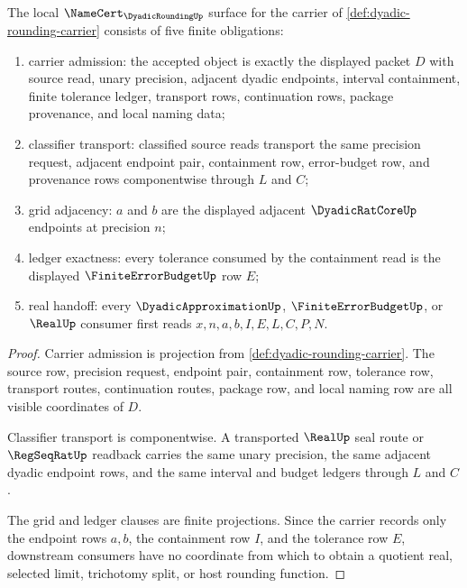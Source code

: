 \begin{theorem}
\label{thm:dyadic-rounding-namecert-obligations}
The local $\NameCert_{\DyadicRoundingUp}$ surface for the carrier of \autoref{def:dyadic-rounding-carrier} consists of five finite obligations:
\begin{enumerate}
\item carrier admission: the accepted object is exactly the displayed packet $D$ with source read, unary precision, adjacent dyadic endpoints, interval containment, finite tolerance ledger, transport rows, continuation rows, package provenance, and local naming data;
\item classifier transport: classified source reads transport the same precision request, adjacent endpoint pair, containment row, error-budget row, and provenance rows componentwise through $L$ and $C$;
\item grid adjacency: $a$ and $b$ are the displayed adjacent $\DyadicRatCoreUp$ endpoints at precision $n$;
\item ledger exactness: every tolerance consumed by the containment read is the displayed $\FiniteErrorBudgetUp$ row $E$;
\item real handoff: every $\DyadicApproximationUp$, $\FiniteErrorBudgetUp$, or $\RealUp$ consumer first reads $x,n,a,b,I,E,L,C,P,N$.
\end{enumerate}
\end{theorem}
\begin{proof}
Carrier admission is projection from \autoref{def:dyadic-rounding-carrier}. The source row, precision request, endpoint pair, containment row, tolerance row, transport routes, continuation routes, package row, and local naming row are all visible coordinates of $D$.

Classifier transport is componentwise. A transported $\RealUp$ seal route or $\RegSeqRatUp$ readback carries the same unary precision, the same adjacent dyadic endpoint rows, and the same interval and budget ledgers through $L$ and $C$.

The grid and ledger clauses are finite projections. Since the carrier records only the endpoint rows $a,b$, the containment row $I$, and the tolerance row $E$, downstream consumers have no coordinate from which to obtain a quotient real, selected limit, trichotomy split, or host rounding function.
\end{proof}

